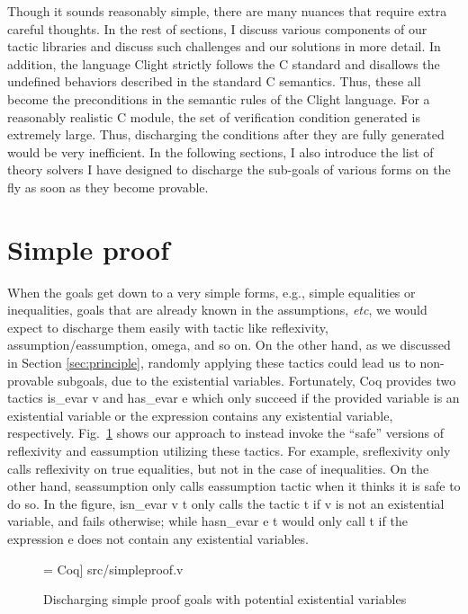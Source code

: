 Though it sounds reasonably simple, there are many nuances that require extra
careful thoughts. 
In the rest of sections, I discuss various components of our tactic libraries
and discuss such challenges and our solutions in more detail.
In addition, the language Clight strictly follows the C standard and disallows the
undefined behaviors described in the standard C semantics. Thus, these all
become the preconditions in the semantic rules of the Clight language. For a
reasonably realistic C module, the set of verification condition generated is
extremely large. Thus, discharging the conditions after they are fully generated
would be very inefficient. In the following sections, I also introduce the list of
theory solvers I have designed to discharge the sub-goals of various forms
on the fly as soon as they become provable.


\section{Simple proof}

When the goals get down to a very simple forms, e.g., simple equalities or inequalities,
goals that are already known in the assumptions, {\it etc}, we would expect to
discharge them easily with tactic like \textsf{reflexivity}, \textsf{assumption/eassumption},
\textsf{omega}, and so on. On the other hand, as we discussed in Section \ref{sec:principle},
randomly applying these tactics could lead us to non-provable subgoals, due to the
existential variables. Fortunately, Coq provides two tactics \textsf{is\_evar v}
and \textsf{has\_evar e} which only succeed if the provided variable is an existential
variable or the expression contains any existential variable, respectively.
Fig.~\ref{fig:simpleproof} shows our approach to instead invoke the ``safe'' versions
of \textsf{reflexivity} and \textsf{eassumption} utilizing these tactics.
For example, \textsf{sreflexivity} only calls \textsf{reflexivity} on true equalities,
but not in the case of inequalities. On the other hand, \textsf{seassumption}
only calls \textsf{eassumption} tactic when it thinks it is safe to do so.
In the figure, \textsf{isn\_evar v t} only calls the tactic t if \textsf{v} is not
an existential variable, and fails otherwise; while \textsf{hasn\_evar e t} would only
call \textsf{t} if the expression \textsf{e} does not contain any existential variables.

\begin{figure}
 = Coq] {src/simpleproof.v}
\caption{Discharging simple proof goals with potential existential variables}
\label{fig:simpleproof}
\end{figure}

